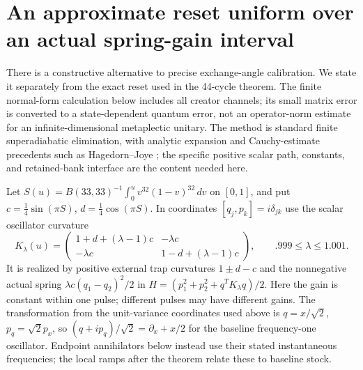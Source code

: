 \documentclass[11pt]{article}
\numberwithin{equation}{section}
\theoremstyle{definition}
\theoremstyle{remark}
\begin{document}
\section{An approximate reset uniform over an actual spring-gain interval}
\label{p2s:sec:gain}

There is a constructive alternative to precise exchange-angle calibration.
We state it separately from the exact reset used in the 44-cycle theorem.
The finite normal-form calculation below includes all creator channels;
its small matrix error is converted to a state-dependent quantum error,
not an operator-norm estimate for an infinite-dimensional metaplectic
unitary. The method is standard finite superadiabatic elimination, with analytic
expansion and Cauchy-estimate precedents such as Hagedorn--Joye
\cite{HagedornJoye2002}; the
specific positive scalar path, constants, and retained-bank interface are
the content needed here.

Let $S(u)=B(33,33)^{-1}\int_0^uv^{32}(1-v)^{32}\,dv$ on $[0,1]$, and put
$c=\tfrac14\sin(\pi S)$, $d=\tfrac14\cos(\pi S)$. In coordinates
$[q_j,p_k]=i\delta_{jk}$ use the scalar oscillator curvature
\begin{equation}\label{p2s:eq:K}
 K_\lambda(u)=
 \begin{pmatrix}1+d+(\lambda-1)c&-\lambda c\\
                 -\lambda c&1-d+(\lambda-1)c\end{pmatrix},
 \qquad .999\leq\lambda\leq1.001.
\end{equation}
It is realized by positive external trap curvatures $1\pm d-c$ and the
nonnegative actual spring $\lambda c(q_1-q_2)^2/2$ in
$H=(p_1^2+p_2^2+q^TK_\lambda q)/2$.
Here the gain is constant within one pulse; different pulses may have
different gains. The transformation from the unit-variance coordinates
used above is $q=x/\sqrt2$, $p_q=\sqrt2p_x$, so
$(q+ip_q)/\sqrt2=\partial_x+x/2$ for the baseline frequency-one
oscillator. Endpoint annihilators below instead use their stated
instantaneous frequencies; the local ramps after the theorem relate
these to baseline stock.
\end{document}
